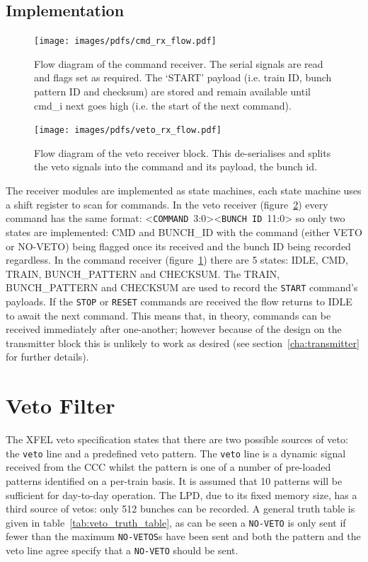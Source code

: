 \subsection{Implementation} %
\label{sub:rx_implementation}

\begin{figure}[htbp]
  \centering
  \texttt{[image: images/pdfs/cmd\_rx\_flow.pdf]}
  \caption{Flow diagram of the command receiver. The serial signals are read and flags set as required. The `START' payload (i.e. train ID, bunch pattern ID and checksum) are stored and remain available until cmd\_i next goes high (i.e. the start of the next command).}
  \label{fig:cmd_rx_flow}
\end{figure}
\begin{figure}[htbp]
  \centering
  \texttt{[image: images/pdfs/veto\_rx\_flow.pdf]}
  \caption{Flow diagram of the veto receiver block. This de-serialises and splits the veto signals into the command and its payload, the bunch id.}
  \label{fig:veto_rx_flow}
\end{figure}
    
The receiver modules are implemented as state machines, each state machine uses a shift register to scan for commands. In the veto receiver (figure~\ref{fig:veto_rx_flow}) every command has the same format: <\texttt{COMMAND}~3:0><\texttt{BUNCH~ID}~11:0> so only two states are implemented: CMD and BUNCH\_ID with the command (either VETO or NO-VETO) being flagged once its received and the bunch ID being recorded regardless. In the command receiver (figure~\ref{fig:cmd_rx_flow}) there are 5 states: IDLE, CMD, TRAIN, BUNCH\_PATTERN and CHECKSUM. The TRAIN, BUNCH\_PATTERN and CHECKSUM are used to record the \texttt{START} command's payloads. If the \texttt{STOP} or \texttt{RESET} commands are received the flow returns to IDLE to await the next command. This means that, in theory, commands can be received immediately after one-another; however because of the design on the transmitter block this is unlikely to work as desired (see section~\ref{cha:transmitter} for further details).
\section{Veto Filter} %
\label{cha:veto_filter}
The XFEL veto specification states that there are two possible sources of veto: the \texttt{veto} line and a predefined veto pattern. The \texttt{veto} line is a dynamic signal received from the CCC whilst the pattern is one of a number of pre-loaded patterns identified on a per-train basis. It is assumed that 10 patterns will be sufficient for day-to-day operation. The LPD, due to its fixed memory size, has a third source of vetos: only 512 bunches can be recorded. A general truth table is given in table~\ref{tab:veto_truth_table}, as can be seen a \texttt{NO-VETO} is only sent if fewer than the maximum \texttt{NO-VETOS}s have been sent and both the pattern and the veto line agree specify that a \texttt{NO-VETO} should be sent.
    
